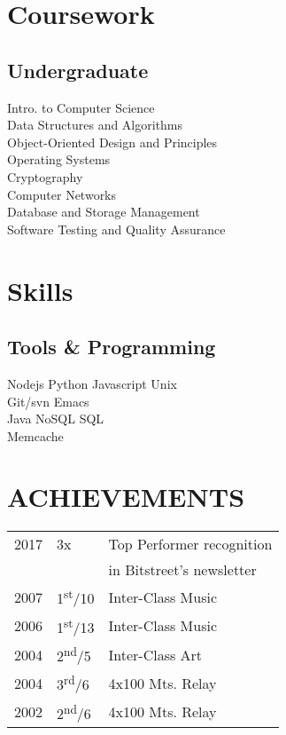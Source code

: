 \documentclass[]{deedy-resume-openfont}
\begin{document}
\begin{minipage}[t]{0.33\textwidth}

\section{Coursework}
\subsection{Undergraduate}
Intro. to Computer Science\\
Data Structures and Algorithms\\ 
Object-Oriented Design and Principles\\
Operating Systems\\
Cryptography \\
Computer Networks \\
Database and Storage Management \\
Software Testing and Quality Assurance
\sectionsep


\section{Skills}
\subsection{Tools \& Programming}
Nodejs \textbullet{} Python \textbullet{} Javascript \textbullet{} Unix \\
Git/svn \textbullet{} Emacs \\
Java \textbullet{} NoSQL \textbullet{} SQL \\
Memcache 
\sectionsep


\section{ACHIEVEMENTS}
\begin{tabular}{rll}
  2017 & 3x & Top Performer recognition\\
  & & in Bitstreet's newsletter\\
  2007 & 1\textsuperscript{st}/10 & Inter-Class Music\\
  2006 & 1\textsuperscript{st}/13 & Inter-Class Music\\
  2004 & 2\textsuperscript{nd}/5 & Inter-Class Art\\
  2004 & 3\textsuperscript{rd}/6 & 4x100 Mts. Relay\\
  2002 & 2\textsuperscript{nd}/6 & 4x100 Mts. Relay
\end{tabular}
\sectionsep


\end{minipage}
\end{document}
